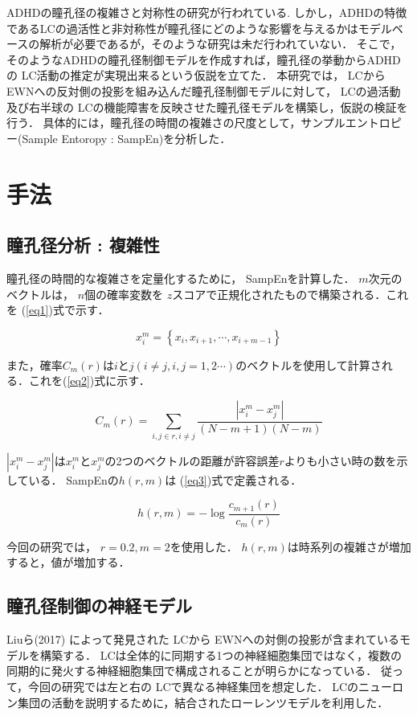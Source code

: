\documentclass[10pt,twocolumn,a4j]{jsarticle}
\begin{document}
ADHDの瞳孔径の複雑さと対称性の研究が行われている\cite{nobukawa2021identification}.
しかし，ADHDの特徴であるLCの過活性と非対称性が瞳孔径にどのような影響を与えるかはモデルベースの解析が必要であるが，そのような研究は未だ行われていない．
そこで，そのようなADHDの瞳孔径制御モデルを作成すれば，瞳孔径の挙動からADHDの LC活動の推定が実現出来るという仮説を立てた．
本研究では， LCから EWNへの反対側の投影を組み込んだ瞳孔径制御モデルに対して， 
LCの過活動及び右半球の LCの機能障害を反映させた瞳孔径モデルを構築し，仮説の検証を行う．
具体的には，瞳孔径の時間の複雑さの尺度として，サンプルエントロピー(Sample Entoropy : SampEn)を分析した．


\section{手法}
\subsection{瞳孔径分析 : 複雑性}
瞳孔径の時間的な複雑さを定量化するために， SampEnを計算した．
$m$次元のベクトルは， $n$個の確率変数を $z$スコアで正規化されたもので構築される．これを (\ref{eq1})式で示す．

\begin{equation}
\label{eq1}
x_{i}^{m}=\left\{x_{i}, x_{i+1}, \cdots, x_{i+m-1}\right\}
\end{equation}

また，確率$C_{m}(r)$は$i$と$j(i \neq j, i, j=1,2 \cdots)$のベクトルを使用して計算される．これを(\ref{eq2})式に示す．

\begin{equation}
\label{eq2}
C_{m}(r)=\sum_{i, j \in r, i \neq j} \frac{\left|x_{i}^{m}-x_{j}^{m}\right|}{(N-m+1)(N-m)}
\end{equation}

$\left|x_{i}^{m}-x_{j}^{m}\right|$は$x_{i}^{m}$と$x_{j}^{m}$の2つのベクトルの距離が許容誤差$r$よりも小さい時の数を示している．
SampEnの$h(r,m)$は (\ref{eq3})式で定義される．

\begin{equation}
\label{eq3}
h(r,m)=-\log \frac{c_{m+1}(r)}{c_{m}(r)}
\end{equation}

今回の研究では， $r=0.2,m=2$を使用した．
$h(r,m)$は時系列の複雑さが増加すると，値が増加する．

\subsection{瞳孔径制御の神経モデル}
Liuら(2017) によって発見された LCから EWNへの対側の投影が含まれているモデルを構築する．
LCは全体的に同期する1つの神経細胞集団ではなく，複数の同期的に発火する神経細胞集団で構成されることが明らかになっている．
従って，今回の研究では左と右の LCで異なる神経集団を想定した．
LCのニューロン集団の活動を説明するために，結合されたローレンツモデルを利用した．
\end{document}
